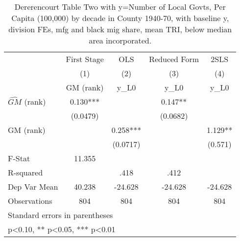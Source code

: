 \begin{table}[htbp]\centering
\def\sym#1{\ifmmode^{#1}\else\(^{#1}\)\fi}
\caption{Dererencourt Table Two with y=Number of Local Govts, Per Capita (100,000) by decade in County 1940-70, with baseline y, division FEs, mfg and black mig share, mean TRI, below median area incorporated.}
\begin{tabular}{l*{4}{c}}
\toprule
                    & First Stage   &         OLS   &Reduced Form   &        2SLS   \\
                    &\multicolumn{1}{c}{(1)}&\multicolumn{1}{c}{(2)}&\multicolumn{1}{c}{(3)}&\multicolumn{1}{c}{(4)}\\
                    &\multicolumn{1}{c}{GM  (rank)}&\multicolumn{1}{c}{y\_L0}&\multicolumn{1}{c}{y\_L0}&\multicolumn{1}{c}{y\_L0}\\
\midrule
$\hat{GM}$ (rank)   &       0.130***&               &       0.147** &               \\
                    &    (0.0479)   &               &    (0.0682)   &               \\
\addlinespace
GM  (rank)          &               &       0.258***&               &       1.129** \\
                    &               &    (0.0717)   &               &     (0.571)   \\
\midrule
F-Stat              &      11.355   &               &               &               \\
R-squared           &               &        .418   &        .412   &               \\
Dep Var Mean        &      40.238   &     -24.628   &     -24.628   &     -24.628   \\
Observations        &         804   &         804   &         804   &         804   \\
\bottomrule
\multicolumn{5}{l}{\footnotesize Standard errors in parentheses}\\
\multicolumn{5}{l}{\footnotesize * p<0.10, ** p<0.05, *** p<0.01}\\
\end{tabular}
\end{table}
